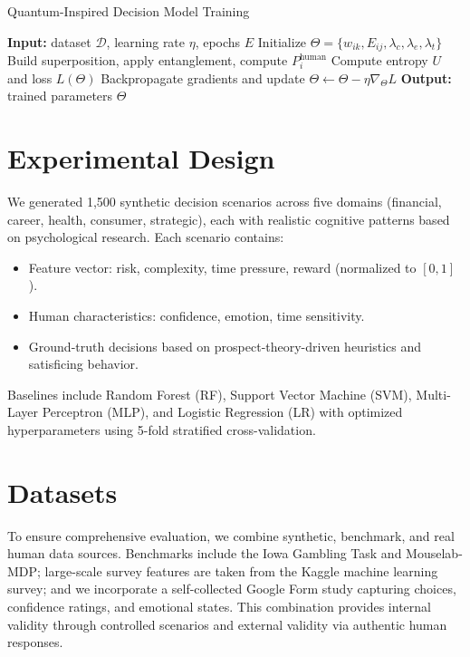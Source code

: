 \documentclass[conference]{IEEEtran}
\begin{document}
\begin{algorithm}[t]
\caption{Quantum-Inspired Decision Model Training}
\begin{algorithmic}[1]
\STATE \textbf{Input:} dataset $\mathcal{D}$, learning rate $\eta$, epochs $E$
\STATE Initialize $\Theta = \{w_{ik}, E_{ij}, \lambda_c, \lambda_e, \lambda_t\}$
    \STATE Build superposition, apply entanglement, compute $P_i^{\text{human}}$
    \STATE Compute entropy $U$ and loss $L(\Theta)$
    \STATE Backpropagate gradients and update $\Theta \leftarrow \Theta - \eta \nabla_\Theta L$
  \ENDFOR
\ENDFOR
\STATE \textbf{Output:} trained parameters $\Theta$
\end{algorithmic}
\end{algorithm}

\section{Experimental Design}

We generated 1,500 synthetic decision scenarios across five domains (financial, career, health, consumer, strategic), each with realistic cognitive patterns based on psychological research. Each scenario contains:
\begin{itemize}
\item Feature vector: risk, complexity, time pressure, reward (normalized to $[0,1]$).
\item Human characteristics: confidence, emotion, time sensitivity.
\item Ground-truth decisions based on prospect-theory-driven heuristics and satisficing behavior.
\end{itemize}
Baselines include Random Forest (RF), Support Vector Machine (SVM), Multi-Layer Perceptron (MLP), and Logistic Regression (LR) with optimized hyperparameters using 5-fold stratified cross-validation.

\section{Datasets}

To ensure comprehensive evaluation, we combine synthetic, benchmark, and real human data sources. Benchmarks include the Iowa Gambling Task and Mouselab-MDP; large-scale survey features are taken from the Kaggle machine learning survey; and we incorporate a self-collected Google Form study capturing choices, confidence ratings, and emotional states. This combination provides internal validity through controlled scenarios and external validity via authentic human responses.
\end{document}
